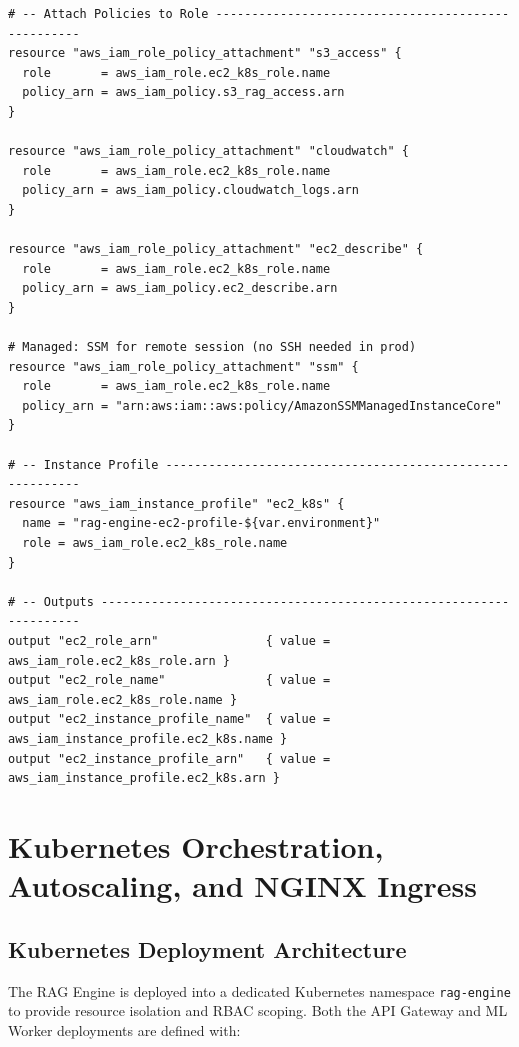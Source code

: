 \documentclass[12pt,a4paper]{report}
\begin{document}
\begin{lstlisting}
# -- Attach Policies to Role ---------------------------------------------------
resource "aws_iam_role_policy_attachment" "s3_access" {
  role       = aws_iam_role.ec2_k8s_role.name
  policy_arn = aws_iam_policy.s3_rag_access.arn
}

resource "aws_iam_role_policy_attachment" "cloudwatch" {
  role       = aws_iam_role.ec2_k8s_role.name
  policy_arn = aws_iam_policy.cloudwatch_logs.arn
}

resource "aws_iam_role_policy_attachment" "ec2_describe" {
  role       = aws_iam_role.ec2_k8s_role.name
  policy_arn = aws_iam_policy.ec2_describe.arn
}

# Managed: SSM for remote session (no SSH needed in prod)
resource "aws_iam_role_policy_attachment" "ssm" {
  role       = aws_iam_role.ec2_k8s_role.name
  policy_arn = "arn:aws:iam::aws:policy/AmazonSSMManagedInstanceCore"
}

# -- Instance Profile ----------------------------------------------------------
resource "aws_iam_instance_profile" "ec2_k8s" {
  name = "rag-engine-ec2-profile-${var.environment}"
  role = aws_iam_role.ec2_k8s_role.name
}

# -- Outputs -------------------------------------------------------------------
output "ec2_role_arn"               { value = aws_iam_role.ec2_k8s_role.arn }
output "ec2_role_name"              { value = aws_iam_role.ec2_k8s_role.name }
output "ec2_instance_profile_name"  { value = aws_iam_instance_profile.ec2_k8s.name }
output "ec2_instance_profile_arn"   { value = aws_iam_instance_profile.ec2_k8s.arn }
\end{lstlisting}
\newpage


\chapter{Kubernetes Orchestration, Autoscaling, and NGINX Ingress}

\section{Kubernetes Deployment Architecture}

The RAG Engine is deployed into a dedicated Kubernetes namespace
\texttt{rag-engine} to provide resource isolation and RBAC scoping. Both the
API Gateway and ML Worker deployments are defined with:
\end{document}
